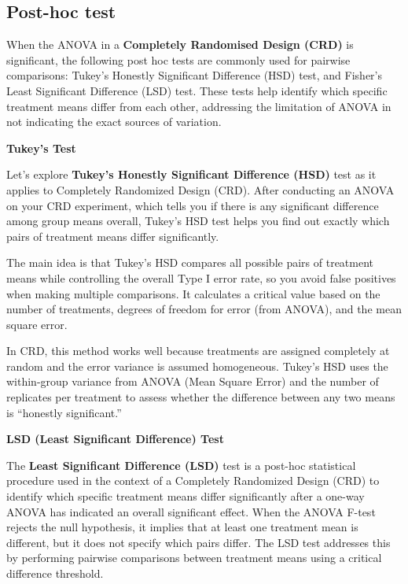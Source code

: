 \documentclass[
  letterpaper,
  DIV=11,
  numbers=noendperiod]{scrartcl}
\begin{document}
\hypertarget{sec-posthoctest}{%
\subsection{Post-hoc test}\label{sec-posthoctest}}

When the ANOVA in a \textbf{Completely Randomised Design (CRD)} is
significant, the following post hoc tests are commonly used for pairwise
comparisons: Tukey's Honestly Significant Difference (HSD) test, and
Fisher's Least Significant Difference (LSD) test. These tests help
identify which specific treatment means differ from each other,
addressing the limitation of ANOVA in not indicating the exact sources
of variation.

\textbf{Tukey's Test}

Let's explore \textbf{Tukey's Honestly Significant Difference (HSD)}
test as it applies to Completely Randomized Design (CRD). After
conducting an ANOVA on your CRD experiment, which tells you if there is
any significant difference among group means overall, Tukey's HSD test
helps you find out exactly which pairs of treatment means differ
significantly.

The main idea is that Tukey's HSD compares all possible pairs of
treatment means while controlling the overall Type I error rate, so you
avoid false positives when making multiple comparisons. It calculates a
critical value based on the number of treatments, degrees of freedom for
error (from ANOVA), and the mean square error.

In CRD, this method works well because treatments are assigned
completely at random and the error variance is assumed homogeneous.
Tukey's HSD uses the within-group variance from ANOVA (Mean Square
Error) and the number of replicates per treatment to assess whether the
difference between any two means is ``honestly significant.''

\textbf{LSD (Least Significant Difference) Test}

The \textbf{Least Significant Difference (LSD)} test is a post-hoc
statistical procedure used in the context of a Completely Randomized
Design (CRD) to identify which specific treatment means differ
significantly after a one-way ANOVA has indicated an overall significant
effect. When the ANOVA F-test rejects the null hypothesis, it implies
that at least one treatment mean is different, but it does not specify
which pairs differ. The LSD test addresses this by performing pairwise
comparisons between treatment means using a critical difference
threshold.
\end{document}
